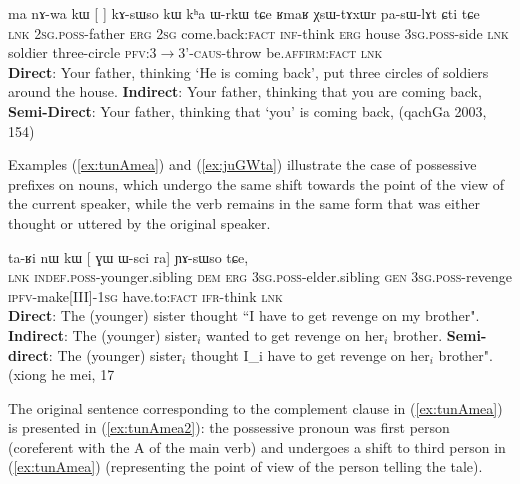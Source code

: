 \documentclass[oldfontcommands,oneside,a4paper,11pt]{article}
\newcommand{\ipa}[1]{{\phon \mbox{#1}}} %
\newcommand{\refb}[1]{(\ref{#1})}
\newcommand{\bleu}[1]{{\color{blue}#1}}
\newcommand{\rouge}[1]{{\color{red}#1}}
\begin{document}
\begin{exe}
\ex \label{ex:nWGi.kAsWso}
\gll 
\ipa{ma} \ipa{nɤ-wa}  	\ipa{kɯ}  	[\rouge{\ipa{nɤʑo}} 	\bleu{\ipa{nɯɣi}}]  	\ipa{kɤ-sɯso}  	\ipa{kɯ}  	\ipa{kʰa}  	\ipa{ɯ-rkɯ} \ipa{tɕe} 	\ipa{ʁmaʁ}  	\ipa{χsɯ-tɤxɯr}  	\ipa{pa-sɯ-lɤt}  	\ipa{ɕti}  	\ipa{tɕe}  \\
\textsc{lnk} \textsc{2sg.poss}-father \textsc{erg} \textsc{2sg} {come.back:\textsc{fact}}  \textsc{inf}-think \textsc{erg} house \textsc{3sg.poss}-side \textsc{lnk} soldier three-circle \textsc{pfv:3$\rightarrow$3'-caus}-throw be.\textsc{affirm}:\textsc{fact} \textsc{lnk}\\
\glt \textbf{Direct}: Your father, thinking `\bleu{He is coming back}',   put three circles of soldiers around the house. 
\glt  \textbf{Indirect}: Your father, thinking that \rouge{you are coming back},
\glt  \textbf{Semi-Direct}: Your father, thinking that `\rouge{you}' \bleu{is coming back}, (qachGa 2003, 154)
\end{exe}
   
Examples \refb{ex:tunAmea} and \refb{ex:juGWta} illustrate the case of possessive prefixes on nouns, which undergo the same shift towards the point of the view of the current speaker, while the verb remains in the same form that was either thought or uttered by the original speaker.

\begin{exe}
\ex \label{ex:tunAmea}
\gll  \ipa{tɕendɤre}  	\ipa{ta-ʁi}  	\ipa{nɯ}  	\ipa{kɯ}  	[\rouge{\ipa{ɯ-pi}}  	\ipa{ɣɯ}  	\ipa{ɯ-sci}  	\bleu{\ipa{tu-nɤme-a}}  	\ipa{ra}] 	\ipa{ɲɤ-sɯso}  	\ipa{tɕe,}  	\\
\textsc{lnk}  \textsc{indef.poss}-younger.sibling \textsc{dem} \textsc{erg}  {\textsc{3sg.poss}-elder.sibling}  \textsc{gen} \textsc{3sg.poss}-revenge {\textsc{ipfv}-make[III]-\textsc{1sg}} have.to:\textsc{fact} \textsc{ifr}-think \textsc{lnk} \\
\glt  \textbf{Direct}: The (younger) sister thought ``\bleu{I have to get revenge} on {my brother}".
\glt  \textbf{Indirect}:  The (younger) sister$_i$ \rouge{wanted to get revenge on her$_i$ brother}.
\glt  \textbf{Semi-direct}:  The (younger) sister$_i$ thought \bleu{I_i have to get revenge} on \rouge{her$_i$ brother}". (xiong he mei, 17
  \end{exe}
  
The original sentence corresponding to the complement clause in \refb{ex:tunAmea} is presented in \refb{ex:tunAmea2}: the possessive pronoun was first person (coreferent with the A of the main verb) and undergoes a shift to third person in \refb{ex:tunAmea} (representing the point of view of the person telling the tale).
\end{document}
